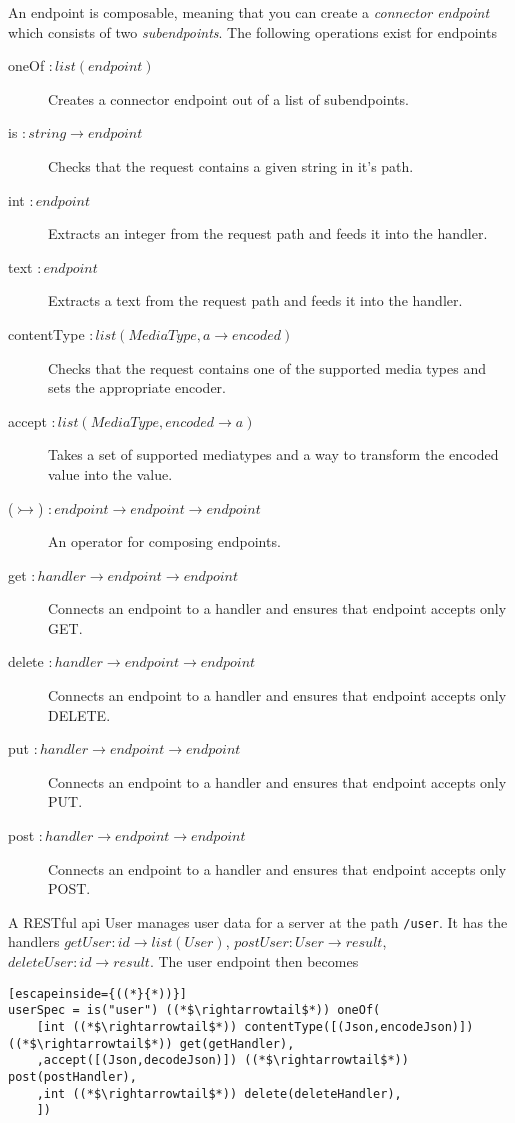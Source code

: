 An endpoint is composable, meaning that you can create a \textit{connector
endpoint} which consists of two \textit{subendpoints}. The following operations
exist for endpoints

\begin{description}
\item [oneOf $: list(endpoint)$] Creates a connector endpoint out of a list of
subendpoints.
\item [is $: string \rightarrow endpoint$] Checks that the request contains a
given string in it's path.
\item [int $: endpoint$] Extracts an integer from the request path and feeds it
into the handler.
\item [text $: endpoint$] Extracts a text from the request path and feeds it into
the handler.
\item [contentType $: list(MediaType,a \rightarrow encoded)$] Checks that the
request contains one of the supported media types and sets the appropriate
encoder.
\item [accept $: list(MediaType,encoded \rightarrow a)$] Takes a set of
supported mediatypes and a way to transform the encoded value into the value.
\item [($\rightarrowtail$) $: endpoint \rightarrow endpoint \rightarrow endpoint$] 
An operator for composing endpoints.
\item [get $: handler \rightarrow endpoint \rightarrow endpoint$] Connects an
endpoint to a handler and ensures that endpoint accepts only GET.
\item [delete $: handler \rightarrow endpoint \rightarrow endpoint$] Connects an
endpoint to a handler and ensures that endpoint accepts only DELETE.
\item [put $: handler \rightarrow endpoint \rightarrow endpoint$] Connects an
endpoint to a handler and ensures that endpoint accepts only PUT.
\item [post $: handler \rightarrow endpoint \rightarrow endpoint$] Connects an
endpoint to a handler and ensures that endpoint accepts only POST.
\end{description}

\begin{exmp}
A RESTful api User manages user data for a server at the path \lstinline{/user}.
It has the handlers $getUser: id \rightarrow list(User)$, $postUser : User
\rightarrow result$, $deleteUser : id \rightarrow result$. The user endpoint
then becomes


\begin{lstlisting}[escapeinside={((*}{*))}]
userSpec = is("user") ((*$\rightarrowtail$*)) oneOf(
    [int ((*$\rightarrowtail$*)) contentType([(Json,encodeJson)]) ((*$\rightarrowtail$*)) get(getHandler),
    ,accept([(Json,decodeJson)]) ((*$\rightarrowtail$*)) post(postHandler),
    ,int ((*$\rightarrowtail$*)) delete(deleteHandler),
    ])
\end{lstlisting}
\end{exmp}





